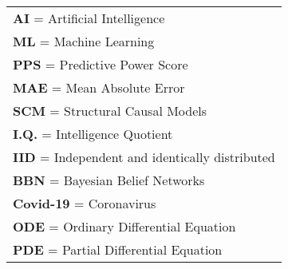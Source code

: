 \newpage
{}

\begin{Listofabbreviations}

\begin{center}
    \begin{tabular}{@{}l@{}}
    \textbf{AI} = Artificial Intelligence \\
    \textbf{ML} = Machine Learning \\
    \textbf{PPS} = Predictive Power Score \\
    \textbf{MAE} = Mean Absolute Error \\
    \textbf{SCM} = Structural Causal Models \\
    \textbf{I.Q.} = Intelligence Quotient \\
    \textbf{IID} = Independent and identically distributed \\
    \textbf{BBN} = Bayesian Belief Networks \\
    \textbf{Covid-19} = Coronavirus \\
    \textbf{ODE} = Ordinary Differential Equation \\
    \textbf{PDE} = Partial Differential Equation \\
    \end{tabular}
\end{center}

\end{Listofabbreviations}
